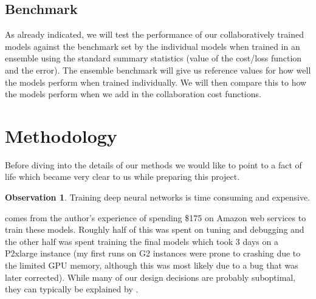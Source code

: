 \documentclass[english,a4paper,oneside]{amsart}
\theoremstyle{definition}
\newtheorem{obs}[thm]{Observation}
\begin{document}
\subsection{Benchmark}

As already indicated, we will test the performance of our collaboratively trained models against the benchmark set by the individual models when trained in an ensemble using the standard summary statistics (value of the cost/loss function and the error).  The ensemble benchmark will give us reference values for how well the models perform when trained individually. We will then compare this to how the models perform when we add in the collaboration cost functions.


\section{Methodology}
Before diving into the details of our methods we would like to point to a fact of life which became very clear to us while preparing this project. 
\begin{obs}\label{ouraxiom}
	Training deep neural networks is time consuming and expensive. 
\end{obs}

 comes from the author's experience of spending \$175 on Amazon web services to train these models. Roughly half of this was spent on tuning and debugging and the other half was spent training the final models which took 3 days on a P2xlarge instance (my first runs on G2 instances were prone to crashing due to the limited GPU memory, although this was most likely due to a bug that was later corrected). While many of our design decisions are probably suboptimal, they can typically be explained by .
\end{document}
